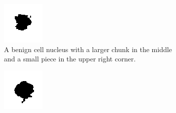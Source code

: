 \documentclass[a4paper, 11pt]{article}
\begin{document}
\begin{figure}[!t!]
 \centering 
\begin{subfigure}[b]{0.4\textwidth}
	\centering
	\includegraphics[width=\textwidth]{benign.png} 
	\caption{A benign cell nucleus with a larger chunk in the middle and a small piece in the upper right corner.}
	\label{benign}
\end{subfigure}
\hfill
\begin{subfigure}[b]{0.4\textwidth}
	\centering
	\includegraphics[width=\textwidth]{malignant.png} 

\end{subfigure}
\end{figure}
\end{document}
